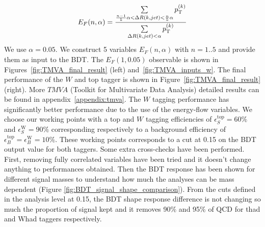 \begin{equation}
E_{F}(n,\alpha) =  \frac{\sum \limits_{\frac{n-1}{5}\alpha < \Delta R(k,jet)< \frac{n}{5}\alpha} p_{\text{T}}^{(k)}}{\sum \limits_{\Delta R(k,jet)< \alpha} p_{\text{T}}^{(k)}}
\end{equation}
\newline
We use $\alpha=0.05$. We construct 5 variables $E_{F}(n,\alpha)$ with $n=1..5$ and provide them as input to the BDT. The $E_{F}(1,0.05)$ observable is shown in 
Figures~\ref{fig:TMVA_final_result} (left) and~\ref{fig:TMVA_inputs_w}.
The final performance of the $W$ and top tagger is shown in Figure~\ref{fig:TMVA_final_result} (right). More $TMVA$ (Toolkit for Multivariate Data Analysis) detailed results can be found in appendix~\ref{appendix:tmva}.
The $W$ tagging performance has significantly better performance due to the use of the energy-flow variables. We choose our working points with a top and $W$ tagging efficiencies of $\epsilon_S^{\text{top}}=60\%$ and $\epsilon_S^{\text{W}}=90\%$ corresponding respectively to a background efficiency of $\epsilon_B^{\text{top}}=\epsilon_B^{\text{W}}=10\%$. These working points corresponds to a cut at 0.15 on the BDT output value for both taggers.
\newline
Some extra cross-checks have been performed. First, removing fully correlated variables have been tried and it doesn't change anything to performances obtained. Then the BDT response has been shown for different signal masses to understand how much the analyses can be mass dependent (Figure \ref{fig:BDT_signal_shape_comparison}). From the cuts defined in the analysis level at 0.15, the BDT shape response difference is not changing so much the proportion of signal kept and it removes 90\% and 95\% of QCD for thad and Whad taggers respectively.

